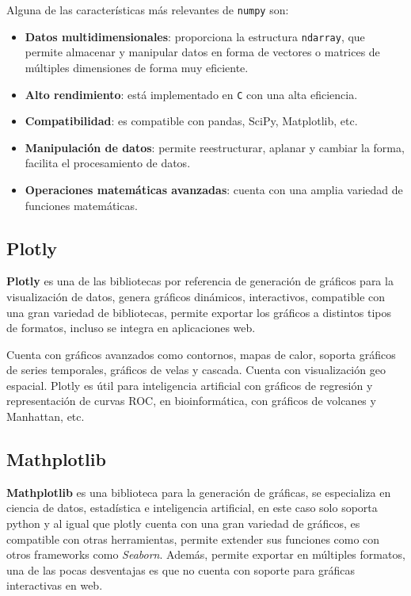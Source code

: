 Alguna de las características más relevantes de \texttt{numpy} son:

\begin{itemize}
    \item \textbf{Datos multidimensionales}: proporciona la estructura \texttt{ndarray}, que permite almacenar y manipular datos en forma de vectores o matrices de múltiples dimensiones de forma muy eficiente.
    \item \textbf{Alto rendimiento}: está implementado en \texttt{C} con una alta eficiencia.
    \item \textbf{Compatibilidad}: es compatible con pandas, SciPy, Matplotlib, etc.
    \item \textbf{Manipulación de datos}: permite reestructurar, aplanar y cambiar la forma, facilita el procesamiento de datos.
    \item \textbf{Operaciones matemáticas avanzadas}: cuenta con una amplia variedad de funciones matemáticas.
\end{itemize}

\subsection{Plotly}

\textbf{Plotly} es una de las bibliotecas por referencia de generación de gráficos para la visualización de datos, genera gráficos dinámicos, interactivos, compatible con una gran variedad de bibliotecas, permite exportar los gráficos a distintos tipos de formatos, incluso se integra en aplicaciones web.

Cuenta con gráficos avanzados como contornos, mapas de calor, soporta gráficos de series temporales, gráficos de velas y cascada. Cuenta con visualización geo espacial. Plotly es útil para inteligencia artificial con gráficos de regresión y representación de curvas ROC, en bioinformática, con gráficos de volcanes y Manhattan, etc.

\subsection{Mathplotlib}

\textbf{Mathplotlib} es una biblioteca para la generación de gráficas, se especializa en ciencia de datos, estadística e inteligencia artificial, en este caso solo soporta python y al igual que plotly cuenta con una gran variedad de gráficos, es compatible con otras herramientas, permite extender sus funciones como con otros frameworks como \textit{Seaborn}. Además, permite exportar en múltiples formatos, una de las pocas desventajas es que no cuenta con soporte para gráficas interactivas en web.

